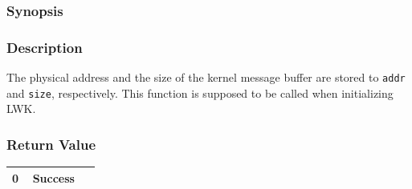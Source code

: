 \documentclass[twoside,11pt,fleqn]{book}
\begin{document}
%

\subsubsection{}
\subsubsection*{Synopsis}{\quad}

\subsubsection*{Description}{\quad}
The physical address and the size of the kernel message buffer are stored to \texttt{addr} and \texttt{size}, respectively.
This function is supposed to be called when initializing LWK.

\subsubsection*{Return Value}{\quad}
\begin{table}[!h]
\footnotesize
\begin{tabular}{|p{0.20\linewidth}|p{0.66\linewidth}|} \hline
0&Success\\ \hline
\end{tabular}
\vspace{-0em}
\end{table}
\FloatBarrier
\end{document}
